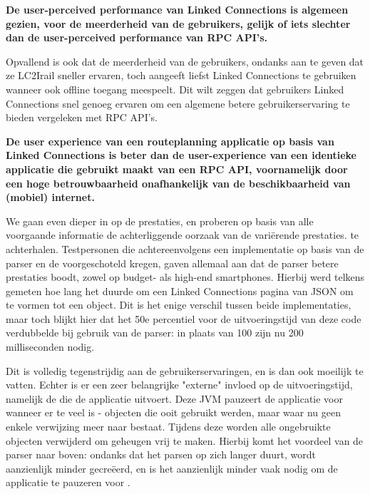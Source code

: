\textbf{De user-perceived performance van Linked Connections is algemeen gezien, voor de meerderheid van de gebruikers, gelijk of iets slechter dan de user-perceived performance van RPC API's.}

Opvallend is ook dat de meerderheid van de gebruikers, ondanks aan te geven dat ze LC2Irail sneller ervaren, toch aangeeft liefst Linked Connections te gebruiken wanneer ook offline toegang meespeelt. Dit wilt zeggen dat gebruikers Linked Connections snel genoeg ervaren om een algemene betere gebruikerservaring te bieden vergeleken met RPC API's.

\textbf{De user experience van een routeplanning applicatie op basis van Linked Connections is beter dan de user-experience van een identieke applicatie die gebruikt maakt van een RPC API, voornamelijk door een hoge betrouwbaarheid onafhankelijk van de beschikbaarheid van (mobiel) internet.}

We gaan even dieper in op de prestaties, en proberen op basis van alle voorgaande informatie de achterliggende oorzaak van de variërende prestaties. te achterhalen. Testpersonen die achtereenvolgens een implementatie op basis van de  parser en de  voorgeschoteld kregen, gaven allemaal aan dat de  parser betere prestaties boodt, zowel op budget- als high-end smartphones. Hierbij werd telkens gemeten hoe lang het duurde om een Linked Connections pagina van JSON om te vormen tot een object. Dit is het enige verschil tussen beide implementaties, maar toch blijkt hier dat het 50e percentiel voor de uitvoeringstijd van deze code verdubbelde bij gebruik van de  parser: in plaats van 100 zijn nu 200 milliseconden nodig.

Dit is volledig tegenstrijdig aan de gebruikerservaringen, en is dan ook moeilijk te vatten. Echter is er een zeer belangrijke "externe" invloed op de uitvoeringstijd, namelijk de  die de applicatie uitvoert. Deze JVM pauzeert de applicatie voor  wanneer er te veel  is - objecten die ooit gebruikt werden, maar waar nu geen enkele verwijzing meer naar bestaat. Tijdens deze  worden alle ongebruikte objecten verwijderd om geheugen vrij te maken. Hierbij komt het voordeel van de  parser naar boven: ondanks dat het parsen op zich langer duurt, wordt aanzienlijk minder  gecreëerd, en is het aanzienlijk minder vaak nodig om de applicatie te pauzeren voor .

